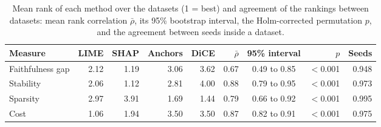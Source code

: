 \begin{table}[t]
\centering
\caption{Mean rank of each method over the datasets (1 = best) and agreement of the rankings between datasets: mean rank correlation $\bar{\rho}$, its 95\% bootstrap interval, the Holm-corrected permutation $p$, and the agreement between seeds inside a dataset.}
\label{tab:primary}
\small
\begin{tabular}{@{}lrrrrrcrr@{}}
\toprule
Measure & LIME & SHAP & Anchors & DiCE & $\bar{\rho}$ & 95\% interval & $p$ & Seeds \\
\midrule
Faithfulness gap & 2.12 & 1.19 & 3.06 & 3.62 & 0.67 & 0.49 to 0.85 & $<$0.001 & 0.948 \\
Stability & 2.06 & 1.12 & 2.81 & 4.00 & 0.88 & 0.79 to 0.95 & $<$0.001 & 0.973 \\
Sparsity & 2.97 & 3.91 & 1.69 & 1.44 & 0.79 & 0.66 to 0.92 & $<$0.001 & 0.995 \\
Cost & 1.06 & 1.94 & 3.50 & 3.50 & 0.87 & 0.82 to 0.91 & $<$0.001 & 0.975 \\
\bottomrule
\end{tabular}
\end{table}
